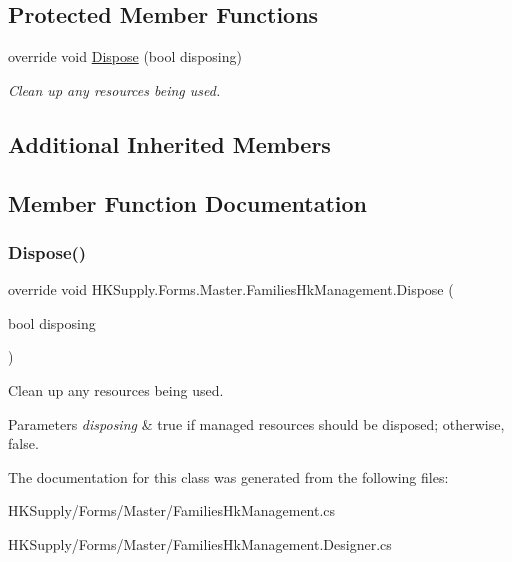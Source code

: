 \subsection*{Protected Member Functions}
\begin{DoxyCompactItemize}
\item 
override void \mbox{\hyperlink{class_h_k_supply_1_1_forms_1_1_master_1_1_families_hk_management_a69931bbec6beb88562138953b787ffc5}{Dispose}} (bool disposing)
\begin{DoxyCompactList}\small\item\em Clean up any resources being used. \end{DoxyCompactList}\end{DoxyCompactItemize}
\subsection*{Additional Inherited Members}


\subsection{Member Function Documentation}
\mbox{\label{class_h_k_supply_1_1_forms_1_1_master_1_1_families_hk_management_a69931bbec6beb88562138953b787ffc5}} 
\subsubsection{\texorpdfstring{Dispose()}{Dispose()}}
{\footnotesize\ttfamily override void H\+K\+Supply.\+Forms.\+Master.\+Families\+Hk\+Management.\+Dispose (\begin{DoxyParamCaption}\item[{bool}]{disposing }\end{DoxyParamCaption})\hspace{0.3cm}{\ttfamily [protected]}}



Clean up any resources being used. 


\begin{DoxyParams}{Parameters}
{\em disposing} & true if managed resources should be disposed; otherwise, false.\\
\hline
\end{DoxyParams}


The documentation for this class was generated from the following files\+:\begin{DoxyCompactItemize}
\item 
H\+K\+Supply/\+Forms/\+Master/Families\+Hk\+Management.\+cs\item 
H\+K\+Supply/\+Forms/\+Master/Families\+Hk\+Management.\+Designer.\+cs\end{DoxyCompactItemize}
